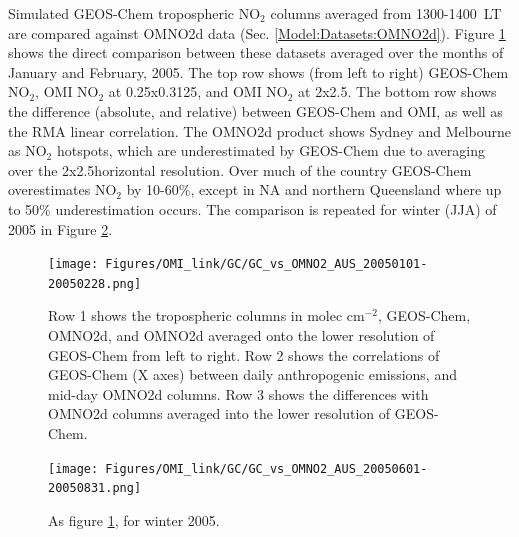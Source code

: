     Simulated GEOS-Chem tropospheric NO$_2$ columns averaged from 1300-1400~LT are compared against OMNO2d data (Sec. \ref{Model:Datasets:OMNO2d}). 
    Figure \ref{Model:Analysis:NOx:fig_GC_vs_OMNO2d_summer_2005} shows the direct comparison between these datasets averaged over the months of January and February, 2005.
    The top row shows (from left to right) GEOS-Chem NO$_2$, OMI NO$_2$ at 0.25x0.3125\degr, and OMI NO$_2$ at 2x2.5\degr.
    The bottom row shows the difference (absolute, and relative) between GEOS-Chem and OMI, as well as the RMA linear correlation.
    The OMNO2d product shows Sydney and Melbourne as NO$_2$ hotspots, which are underestimated by GEOS-Chem due to averaging over the 2x2.5\degr horizontal resolution.
    Over much of the country GEOS-Chem overestimates NO$_2$ by 10-60\%, except in NA and northern Queensland where up to 50\% underestimation occurs.
    The comparison is repeated for winter (JJA) of 2005 in Figure \ref{Model:Analysis:NOx:fig_GC_vs_OMNO2d_winter_2005}.
    
    \begin{figure}
      \texttt{[image: Figures/OMI\_link/GC/GC\_vs\_OMNO2\_AUS\_20050101-20050228.png]}
      \caption{%
        Row 1 shows the tropospheric columns in molec cm$^{-2}$, GEOS-Chem, OMNO2d, and OMNO2d averaged onto the lower resolution of GEOS-Chem from left to right.
        Row 2 shows the correlations of GEOS-Chem (X axes) between daily anthropogenic emissions, and mid-day OMNO2d columns.
        Row 3 shows the differences with OMNO2d columns averaged into the lower resolution of GEOS-Chem.
      }
      \label{Model:Analysis:NOx:fig_GC_vs_OMNO2d_summer_2005}
    \end{figure}
    
    \begin{figure}
      \texttt{[image: Figures/OMI\_link/GC/GC\_vs\_OMNO2\_AUS\_20050601-20050831.png]}
      \caption{%
        As figure \ref{Model:Analysis:NOx:fig_GC_vs_OMNO2d_summer_2005}, for winter 2005.
      }
      \label{Model:Analysis:NOx:fig_GC_vs_OMNO2d_winter_2005}
    \end{figure}
    
